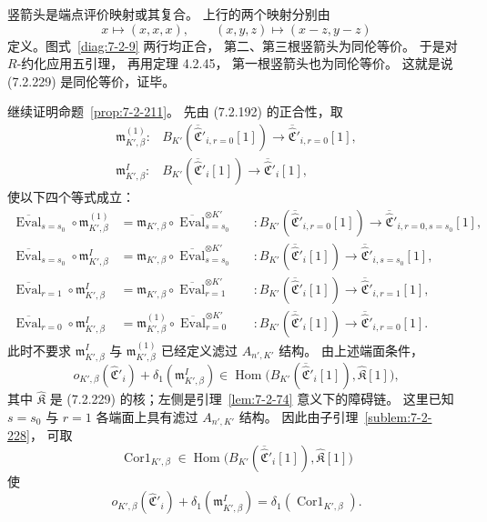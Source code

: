 竖箭头是端点评价映射或其复合。
上行的两个映射分别由
\[
x\longmapsto(x,x,x),
\qquad(x,y,z)\longmapsto(x-z,y-z)
\]
定义。图式~\ref{diag:7-2-9} 两行均正合，
第二、第三根竖箭头为同伦等价。
于是对 $R$-约化应用五引理，
再用定理 4.2.45，
第一根竖箭头也为同伦等价。
这就是说 (7.2.229) 是同伦等价，证毕。

继续证明命题~\ref{prop:7-2-211}。
先由 (7.2.192) 的正合性，取
\[
\begin{aligned}
\mathfrak m^{(1)}_{K',\beta}\colon
&B_{K'}(\overline{\widehat{\mathfrak C}}'_{i,r=0}[1])
\longrightarrow
\overline{\widehat{\mathfrak C}}'_{i,r=0}[1],\\
\mathfrak m^I_{K',\beta}\colon
&B_{K'}(\overline{\widehat{\mathfrak C}}'_i[1])
\longrightarrow
\overline{\widehat{\mathfrak C}}'_i[1],
\end{aligned}
\]
使以下四个等式成立：
\[
\begin{aligned}
\overline{\operatorname{Eval}}_{s=s_0}\circ
\mathfrak m^{(1)}_{K',\beta}
&=\mathfrak m_{K',\beta}\circ
\overline{\operatorname{Eval}}_{s=s_0}^{\otimes K'}
&&\colon B_{K'}(\overline{\widehat{\mathfrak C}}'_{i,r=0}[1])
\to\overline{\widehat{\mathfrak C}}'_{i,r=0,s=s_0}[1],\\
\overline{\operatorname{Eval}}_{s=s_0}\circ
\mathfrak m^I_{K',\beta}
&=\mathfrak m_{K',\beta}\circ
\overline{\operatorname{Eval}}_{s=s_0}^{\otimes K'}
&&\colon B_{K'}(\overline{\widehat{\mathfrak C}}'_i[1])
\to\overline{\widehat{\mathfrak C}}'_{i,s=s_0}[1],\\
\overline{\operatorname{Eval}}_{r=1}\circ
\mathfrak m^I_{K',\beta}
&=\mathfrak m_{K',\beta}\circ
\overline{\operatorname{Eval}}_{r=1}^{\otimes K'}
&&\colon B_{K'}(\overline{\widehat{\mathfrak C}}'_i[1])
\to\overline{\widehat{\mathfrak C}}'_{i,r=1}[1],\\
\overline{\operatorname{Eval}}_{r=0}\circ
\mathfrak m^I_{K',\beta}
&=\mathfrak m^{(1)}_{K',\beta}\circ
\overline{\operatorname{Eval}}_{r=0}^{\otimes K'}
&&\colon B_{K'}(\overline{\widehat{\mathfrak C}}'_i[1])
\to\overline{\widehat{\mathfrak C}}'_{i,r=0}[1].
\end{aligned}
\]
此时不要求 $\mathfrak m^I_{K',\beta}$
与 $\mathfrak m^{(1)}_{K',\beta}$
已经定义滤过 $A_{n',K'}$ 结构。
由上述端面条件，
\[
o_{K',\beta}(\widehat{\mathfrak C}'_i)
+\delta_1(\mathfrak m^I_{K',\beta})
\in\operatorname{Hom}\bigl(
B_{K'}(\overline{\widehat{\mathfrak C}}'_i[1]),
\widehat{\mathfrak K}[1]
\bigr),
\]
其中 $\widehat{\mathfrak K}$ 是 (7.2.229)
的核；左侧是引理~\ref{lem:7-2-74}
意义下的障碍链。
这里已知 $s=s_0$ 与 $r=1$
各端面上具有滤过 $A_{n',K'}$ 结构。
因此由子引理~\ref{sublem:7-2-228}，
可取
\[
\operatorname{Cor1}_{K',\beta}
\in\operatorname{Hom}\bigl(
B_{K'}(\overline{\widehat{\mathfrak C}}'_i[1]),
\widehat{\mathfrak K}[1]
\bigr)
\]
使
\[
o_{K',\beta}(\widehat{\mathfrak C}'_i)
+\delta_1(\mathfrak m^I_{K',\beta})
=\delta_1(\operatorname{Cor1}_{K',\beta}).
\]

